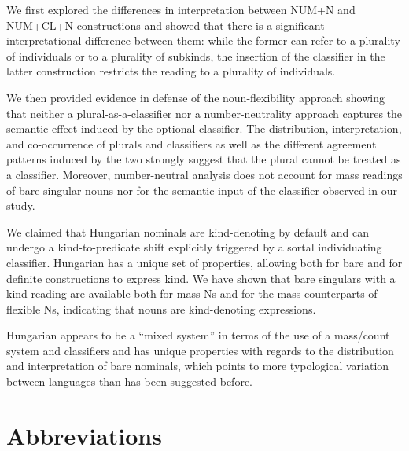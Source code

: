 \documentclass[output=paper]{langscibook}
\begin{document}
We first explored the differences in interpretation between NUM+N and \linebreak NUM+CL+N constructions and showed that there is a significant interpretational difference between them: while the former can refer to a plurality of individuals or to a plurality of subkinds, the insertion of the classifier in the latter construction restricts the reading to a plurality of individuals. 

We then provided evidence in defense of the noun-flexibility approach showing that neither a plural-as-a-classifier nor a number-neutrality approach captures the semantic effect induced by the optional classifier.  The distribution, interpretation, and co-occurrence of plurals and classifiers as well as the different agreement patterns induced by the two strongly suggest that the plural cannot be treated as a classifier. Moreover, number-neutral analysis does not account for mass readings of bare singular nouns nor for the semantic input of the classifier observed in our study. 

We claimed that Hungarian nominals are kind-denoting by default and can undergo a kind-to-predicate shift \citep{chierchia-98a} explicitly triggered by a sortal individuating classifier. Hungarian has a unique set of properties, allowing both for bare and for definite constructions to express kind. We have shown that bare singulars with a kind-reading are available both for mass Ns and for the mass counterparts of flexible Ns, indicating that nouns are kind-denoting expressions. 

Hungarian appears to be a ``mixed system'' in terms of the use of a mass/count system and classifiers and has unique properties with regards to the distribution and interpretation of bare nominals, which points to more typological variation between languages than has been suggested before. 

%

\section*{Abbreviations}
\end{document}
